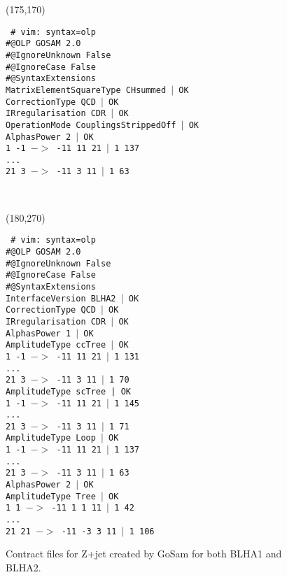\begin{figure}[h]
\begin{center}
\framebox(175,170){%
    \parbox{180\unitlength}{\tt\scriptsize
\# vim: syntax=olp\\
\#@OLP GOSAM 2.0\\
\#@IgnoreUnknown False\\
\#@IgnoreCase False\\
\#@SyntaxExtensions \\
MatrixElementSquareType CHsummed $|$ OK\\
CorrectionType QCD $|$ OK\\
IRregularisation CDR $|$ OK\\
OperationMode  CouplingsStrippedOff $|$ OK\\
AlphasPower 2 $|$ OK\\
1 -1 $->$ -11 11 21 $|$ 1 137\\
...\\
21 3 $->$ -11 3 11 $|$ 1 63\\}
}
\parbox{5\unitlength}{\ }\framebox(180,270){%
    \parbox{170\unitlength}{\tt\scriptsize
\# vim: syntax=olp\\
\#@OLP GOSAM 2.0\\
\#@IgnoreUnknown False\\
\#@IgnoreCase False\\
\#@SyntaxExtensions \\
InterfaceVersion BLHA2 $|$ OK\\
CorrectionType QCD $|$ OK\\
IRregularisation CDR $|$ OK\\
AlphasPower 1 $|$ OK\\
AmplitudeType ccTree $|$ OK\\
1 -1 $->$ -11 11 21 $|$ 1 131\\
...\\
21 3 $->$ -11 3 11 $|$ 1 70\\
AmplitudeType scTree | OK\\
1 -1 $->$ -11 11 21 $|$ 1 145\\
...\\
21 3 $->$ -11 3 11 $|$ 1 71\\
AmplitudeType Loop $|$ OK\\
1 -1 $->$ -11 11 21 $|$ 1 137\\
...\\
21 3 $->$ -11 3 11 $|$ 1 63\\
AlphasPower 2 $|$ OK\\
AmplitudeType Tree $|$ OK\\
1 1 $->$ -11 1 1 11 $|$ 1 42\\
...\\
21 21 $->$ -11 -3 3 11 $|$ 1 106\\}
}
\caption{Contract files for Z+jet created by {\sc GoSam} for both BLHA1 and BLHA2.}
\label{fig:contractLH}
\end{center}
\end{figure}  

